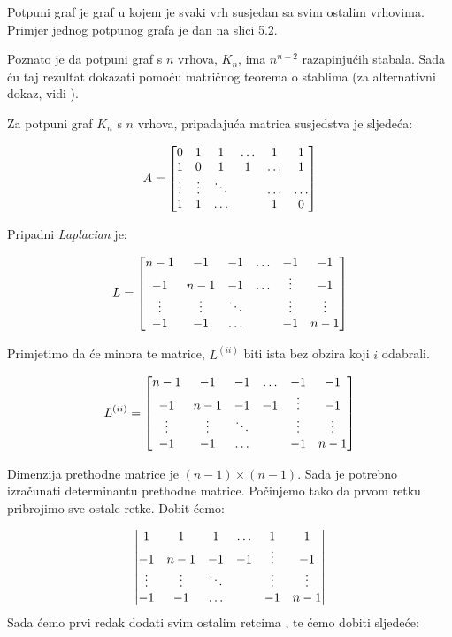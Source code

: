 \documentclass[times, utf8, zavrsni]{fer}
\begin{document}
Potpuni graf je graf u kojem je svaki vrh susjedan sa svim ostalim vrhovima. Primjer jednog potpunog grafa je dan na slici 5.2.

Poznato je da potpuni graf s $n$ vrhova, $K_n$, ima $n^{n-2}$ razapinjućih stabala. Sada ću taj rezultat dokazati pomoću matričnog teorema o stablima (za alternativni dokaz, vidi \cite{KKNP}).

Za potpuni graf $K_n$ s $n$ vrhova, pripadajuća matrica susjedstva je sljedeća:

\[
\centering
A = 
\begin{bmatrix}
	0 & 1 & 1 & \ldots & 1 & 1 \\
	1 & 0 & 1 & 1 & \ldots & 1 \\
	\vdots & \vdots & \ddots & & \ldots & \ldots  \\
	1 & 1 & \ldots & & 1 & 0
\end{bmatrix}
\]

Pripadni \textit{Laplacian} je:

\[
\centering
L = 
\begin{bmatrix}
	n-1 & -1 & -1 & \ldots & -1 & -1 \\
	-1 & n-1 & -1 & \ldots & \vdots & -1 \\
	\vdots & \vdots & \ddots & & \vdots & \vdots \\
	-1 & -1 & \ldots & & -1 & n-1
\end{bmatrix}
\]

Primjetimo da će minora te matrice, $L^{(ii)}$ biti ista bez obzira koji $i$ odabrali.

\[
\centering
L^{(ii)} = 
\begin{bmatrix}
	n-1 & -1 & -1 & \ldots & -1 & -1 \\
	-1 & n-1 & -1 & -1 & \vdots & -1 \\
	\vdots & \vdots & \ddots & & \vdots & \vdots  \\
	-1 & -1 & \ldots & & -1 & n-1
\end{bmatrix}
\]

Dimenzija prethodne matrice je $(n-1) \times (n-1)$. Sada je potrebno izračunati determinantu prethodne matrice. Počinjemo tako da prvom retku pribrojimo sve ostale retke. Dobit ćemo:
 
 \[
	\centering
	\left|
	\begin{matrix}
		1 & 1 & 1 & \ldots & 1 & 1 \\
		-1 & n-1 & -1 & -1 & \vdots & -1 \\
		\vdots & \vdots & \ddots & & \vdots & \vdots  \\
		-1 & -1 & \ldots & & -1 & n-1
	\end{matrix}
	\right|
\]
Sada ćemo prvi redak dodati svim ostalim retcima , te ćemo dobiti sljedeće:
\end{document}
